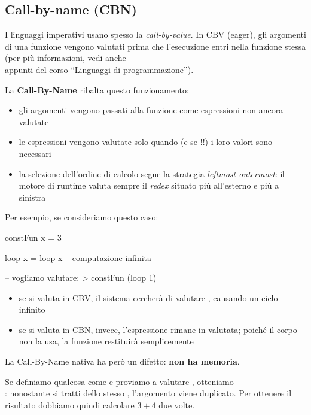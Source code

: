 \subsection{Call-by-name (CBN)}
I linguaggi imperativi usano spesso la \textit{call-by-value}. In CBV (eager), gli argomenti di una funzione vengono valutati prima che l'esecuzione entri nella funzione stessa (per più informazioni, vedi anche \\ \href{https://raw.githubusercontent.com/AglaiaNorza/notes-ig/main/terzo%20anno/linguaggi%20di%20programmazione.pdf}{\underline{appunti del corso ``Linguaggi di programmazione''}}).

La \textbf{Call-By-Name} ribalta questo funzionamento:
\begin{itemize}
    \item gli argomenti vengono passati alla funzione come espressioni non ancora valutate
    \item le espressioni vengono valutate solo quando (e se !!) i loro valori sono necessari
    \item la selezione dell'ordine di calcolo segue la strategia \textit{leftmost-outermost}: il motore di runtime valuta sempre il \textit{redex} situato più all'esterno e più a sinistra
\end{itemize}

Per esempio, se consideriamo questo caso:
\begin{haskellbox}{}
constFun x = 3

loop x = loop x -- computazione infinita

-- vogliamo valutare:
> constFun (loop 1)
\end{haskellbox}
\begin{itemize}
    \item se si valuta  in CBV, il sistema cercherà di valutare , causando un ciclo infinito
    \item se si valuta in CBN, invece, l'espressione rimane in-valutata; poiché il corpo non la usa, la funzione restituirà semplicemente 
\end{itemize}

La Call-By-Name nativa ha però un difetto: \textbf{non ha memoria}.

Se definiamo qualcosa come  e proviamo a valutare , otteniamo \\ : nonostante si tratti dello stesso , l'argomento viene duplicato. Per ottenere il risultato dobbiamo quindi calcolare $3+4$ due volte.

